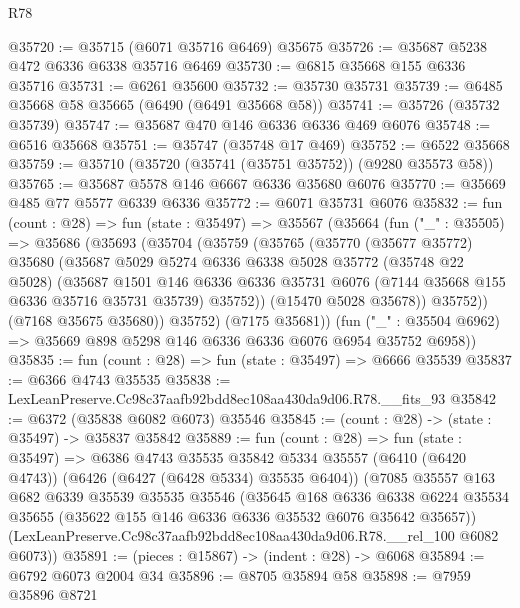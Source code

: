 \begin{lexlean}{R78}
\begin{coremodule}
@35720 := @35715 (@6071 @35716 @6469) @35675
@35726 := @35687 @5238 @472 @6336 @6338 @35716 @6469
@35730 := @6815 @35668 @155 @6336 @35716
@35731 := @6261 @35600
@35732 := @35730 @35731
@35739 := @6485 @35668 @58 @35665 (@6490 (@6491 @35668 @58))
@35741 := @35726 (@35732 @35739)
@35747 := @35687 @470 @146 @6336 @6336 @469 @6076
@35748 := @6516 @35668
@35751 := @35747 (@35748 @17 @469)
@35752 := @6522 @35668
@35759 := @35710 (@35720 (@35741 (@35751 @35752)) (@9280 @35573 @58))
@35765 := @35687 @5578 @146 @6667 @6336 @35680 @6076
@35770 := @35669 @485 @77 @5577 @6339 @6336
@35772 := @6071 @35731 @6076
@35832 := fun (count : @28) =>
  fun (state : @35497) =>
  @35567
    (@35664
      (fun ("_" : @35505) =>
      @35686
        (@35693
          (@35704
            (@35759
              (@35765
                (@35770
                  (@35677 @35772)
                  @35680
                  (@35687
                    @5029
                    @5274
                    @6336
                    @6338
                    @5028
                    @35772
                    (@35748 @22 @5028)
                    (@35687
                      @1501
                      @146
                      @6336
                      @6336
                      @35731
                      @6076
                      (@7144 @35668 @155 @6336 @35716 @35731 @35739)
                      @35752))
                  (@15470 @5028 @35678))
                @35752))
            (@7168 @35675 @35680))
          @35752)
        (@7175 @35681))
      (fun ("_" : @35504 @6962) => @35669 @898 @5298 @146 @6336 @6336 @6076 @6954 @35752 @6958))
@35835 := fun (count : @28) => fun (state : @35497) => @6666 @35539
@35837 := @6366 @4743 @35535
@35838 := LexLeanPreserve.Cc98c37aafb92bdd8ec108aa430da9d06.R78.__fits_93
@35842 := @6372 (@35838 @6082 @6073) @35546
@35845 := (count : @28) -> (state : @35497) -> @35837 @35842
@35889 := fun (count : @28) =>
  fun (state : @35497) =>
  @6386
    @4743
    @35535
    @35842
    @5334
    @35557
    (@6410 (@6420 @4743))
    (@6426 (@6427 (@6428 @5334) @35535 @6404))
    (@7085
      @35557
      @163
      @682
      @6339
      @35539
      @35535
      @35546
      (@35645
        @168
        @6336
        @6338
        @6224
        @35534
        @35655
        (@35622 @155 @146 @6336 @6336 @35532 @6076 @35642 @35657))
      (LexLeanPreserve.Cc98c37aafb92bdd8ec108aa430da9d06.R78.__rel_100 @6082 @6073))
@35891 := (pieces : @15867) -> (indent : @28) -> @6068
@35894 := @6792 @6073 @2004 @34
@35896 := @8705 @35894 @58
@35898 := @7959 @35896 @8721

\end{coremodule}
\end{lexlean}
